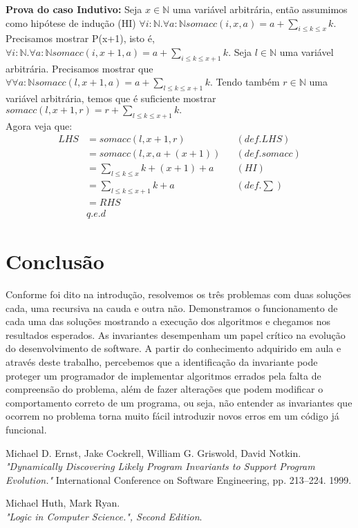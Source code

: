 \documentclass{article}
\begin{document}
\textbf{Prova do caso Indutivo:} Seja $x \in \mathbb{N}$ uma variável arbitrária, então assumimos como hipótese
de indução (HI) $\forall i:\mathbb{N}.\forall a:\mathbb{N} somacc(i, x, a) = a + \sum\limits_{i \le k \le x} k.$
Precisamos mostrar P(x+1), isto é,
$\forall i:\mathbb{N}.\forall a:\mathbb{N} somacc(i, x+1, a) = a + \sum\limits_{i \le k \le x+1} k.$
Seja $l \in \mathbb{N}$ uma variável arbitrária. Precisamos  mostrar que
$\forall \forall a:\mathbb{N} somacc(l, x+1, a) = a + \sum\limits_{l \le k \le x+1} k.$
Tendo também $r \in \mathbb{N}$ uma variável arbitrária, temos que é suficiente mostrar
$somacc(l, x+1, r) = r + \sum\limits_{l \le k \le x+1} k.$\\
Agora veja que:
\begin{align*}
LHS &= somacc(l, x+1, r) && (def. LHS)\\
&= somacc(l, x, a+(x+1)) && (def. somacc)\\
&= \sum\limits_{l \le k \le x} k + (x+1) + a && (HI)\\
&= \sum\limits_{l \le k \le x+1} k + a && (def. \sum)\\
&= RHS\\
& q.e.d
\end{align*}
\section{Conclusão}
Conforme foi dito na introdução, resolvemos os três problemas com duas soluções cada, uma recursiva na cauda e outra não.
Demonstramos o funcionamento de cada uma das soluções mostrando a execução dos algoritmos e chegamos nos resultados esperados.
As invariantes desempenham um papel crítico na evolução do desenvolvimento de software. A partir do conhecimento
adquirido em aula e através deste trabalho, percebemos que a identificação da invariante pode proteger um programador
de implementar algoritmos errados pela falta de compreensão do problema, além de fazer alterações que podem modificar o
comportamento correto de um programa, ou seja, não entender as invariantes que ocorrem
no problema torna muito fácil introduzir novos erros em um código já funcional.

\begin{thebibliography}{9}
	Michael D. Ernst, Jake Cockrell, William G. Griswold, David Notkin.\\
	\emph{"Dynamically Discovering Likely Program Invariants to Support Program Evolution."}
	International Conference on Software Engineering, pp. 213–224. 1999.

	Michael Huth, Mark Ryan.\\
	\emph{"Logic in Computer Science.", Second Edition}.
\end{thebibliography}
\end{document}
